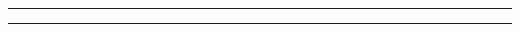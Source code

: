 \begin{problem}{4.14}

\end{problem}
\begin{solution}

\end{solution}

\noindent\rule{7in}{1.5pt}


\begin{problem}{4.15}

\end{problem}
\begin{solution}

\end{solution}

\noindent\rule{7in}{1.5pt}

